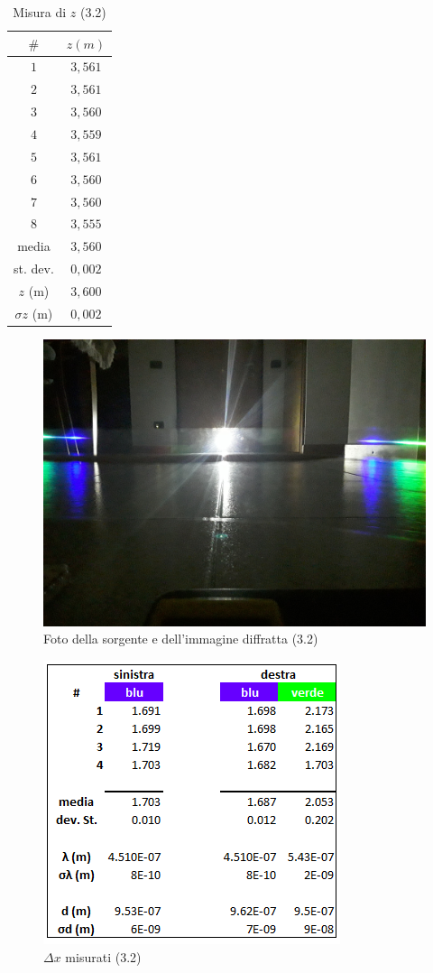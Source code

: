\documentclass{article}
\begin{document}
\begin{table}[h!]
\centering
\begin{tabular}{ | c | c | }
  \hline
  $\#$ & $z (m)$ \\
  \hline
  $1$ & $3,561$ \\
  $2$ & $3,561$ \\
  $3$ & $3,560$ \\
  $4$ & $3,559$ \\
  $5$ & $3,561$ \\
  $6$ & $3,560$ \\
  $7$ & $3,560$ \\
  $8$ & $3,555$ \\
  \hline 
  media & $3,560$ \\
  st. dev. & $0,002$ \\
  \hline
  $z$ (m) & $3,600$ \\
  $\sigma z$ (m) & $0,002$ \\
  \hline
\end{tabular}
\caption{Misura di $z$ (3.2)}
\end{table}

\begin{figure}[h!]
  \centering
  \includegraphics[width=0.6\linewidth]{IM 1.2}
  \caption{Foto della sorgente e dell'immagine diffratta (3.2)}
\end{figure}

\begin{figure}[h!]
  \centering
  \includegraphics[width=0.4\linewidth]{IM tab_1.2}
  \caption{$\Delta x$ misurati (3.2)}
\end{figure}
\end{document}
